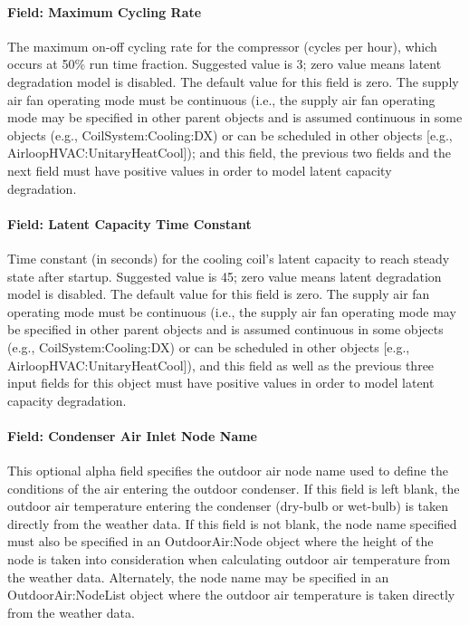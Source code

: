 \paragraph{Field: Maximum Cycling Rate}\label{field-maximum-cycling-rate-1}

The maximum on-off cycling rate for the compressor (cycles per hour), which occurs at 50\% run time fraction. Suggested value is 3; zero value means latent degradation model is disabled. The default value for this field is zero. The supply air fan operating mode must be continuous (i.e., the supply air fan operating mode may be specified in other parent objects and is assumed continuous in some objects (e.g., CoilSystem:Cooling:DX) or can be scheduled in other objects {[}e.g., AirloopHVAC:UnitaryHeatCool{]}); and this field, the previous two fields and the next field must have positive values in order to model latent capacity degradation.

\paragraph{Field: Latent Capacity Time Constant}\label{field-latent-capacity-time-constant-1}

Time constant (in seconds) for the cooling coil's latent capacity to reach steady state after startup. Suggested value is 45; zero value means latent degradation model is disabled. The default value for this field is zero. The supply air fan operating mode must be continuous (i.e., the supply air fan operating mode may be specified in other parent objects and is assumed continuous in some objects (e.g., CoilSystem:Cooling:DX) or can be scheduled in other objects {[}e.g., AirloopHVAC:UnitaryHeatCool{]}), and this field as well as the previous three input fields for this object must have positive values in order to model latent capacity degradation.

\paragraph{Field: Condenser Air Inlet Node Name}\label{field-condenser-air-inlet-node-name-4}

This optional alpha field specifies the outdoor air node name used to define the conditions of the air entering the outdoor condenser. If this field is left blank, the outdoor air temperature entering the condenser (dry-bulb or wet-bulb) is taken directly from the weather data. If this field is not blank, the node name specified must also be specified in an OutdoorAir:Node object where the height of the node is taken into consideration when calculating outdoor air temperature from the weather data. Alternately, the node name may be specified in an OutdoorAir:NodeList object where the outdoor air temperature is taken directly from the weather data.

